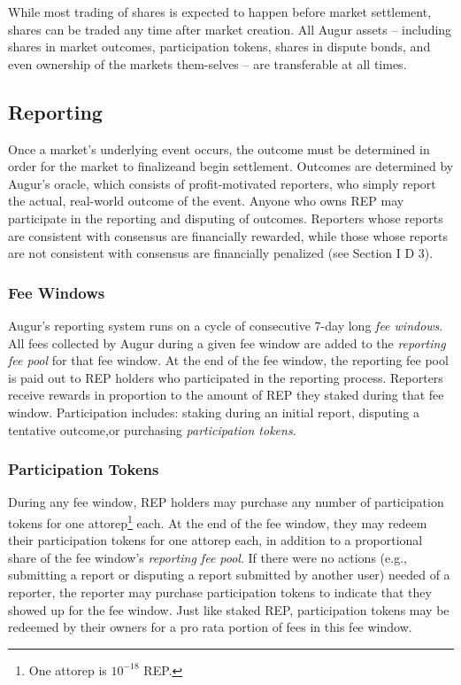\documentclass[12pt,floatfix,reprint,nofootinbib,amsmath,amssymb,epsfig,pre,floats,letterpaper,groupedaffiliation]{revtex4-1}
\theoremstyle{definition}
\theoremstyle{definition}
\begin{document}
While most trading of shares is expected to happen before market settlement, shares can be traded any time after market creation. All Augur assets -- including shares in market outcomes, participation tokens, shares in dis\-pute bonds, and even ownership of the markets them-\linebreak selves -- are transferable at all times.

\subsection{Reporting}

Once a market's underlying event occurs, the outcome must be determined in order for the market to finalize\linebreak and begin settlement. Outcomes are determined by Augur's oracle, which consists of profit-motivated reporters, who simply report the actual, real-world outcome of the event. Anyone who owns REP may participate in the reporting and disputing of outcomes. Reporters whose reports are consistent with consensus are financially rewarded, while those whose reports are not consistent with consensus are financially penalized (see Section I D 3).

\subsubsection{Fee Windows}

Augur's reporting system runs on a cycle of consecu\-tive 7-day long \textit{fee windows}. All fees collected by Augur during a given fee window are added to the \textit{reporting fee pool} for that fee window. At the end of the fee window, the reporting fee pool is paid out to REP holders who participated in the reporting process. Reporters receive rewards in proportion to the amount of REP they staked during that fee window. Participation includes: staking during an initial report, disputing a tentative outcome,\linebreak or purchasing \textit{participation tokens}.

\subsubsection{Participation Tokens}

During any fee window, REP holders may purchase any number of participation tokens for one attorep\footnote{One attorep is $10^{-18}$ REP.} each. At the end of the fee window, they may redeem their\linebreak \vspace{\baselineskip} participation tokens for one attorep each, in addition to a proportional share of the fee window's \textit{reporting fee pool}. If there were no actions (e.g., submitting a report or disputing a report submitted by another user) needed of a reporter, the reporter may purchase participation tokens to indicate that they showed up for the fee window. Just like staked REP, participation tokens may be redeemed by their owners for a pro rata portion of fees in this fee window.
\end{document}
